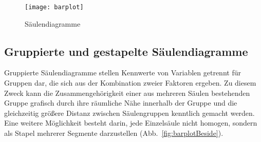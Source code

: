 \begin{figure}[ht]
\centering
\texttt{[image: barplot]}
\vspace*{-1em}
\caption{Säulendiagramme}
\label{fig:barplot}
\end{figure}

\subsection{Gruppierte und gestapelte Säulendiagramme}
\label{sec:barchartGroup}

Gruppierte Säulendiagramme stellen Kennwerte von Variablen getrennt für Gruppen dar, die sich aus der Kombination zweier Faktoren ergeben. Zu diesem Zweck kann die Zusammengehörigkeit einer aus mehreren Säulen bestehenden Gruppe grafisch durch ihre räumliche Nähe innerhalb der Gruppe und die gleichzeitig größere Distanz zwischen Säulengruppen kenntlich gemacht werden. Eine weitere Möglichkeit besteht darin, jede Einzelsäule nicht homogen, sondern als Stapel mehrerer Segmente darzustellen (Abb.\ \ref{fig:barplotBeside}).

